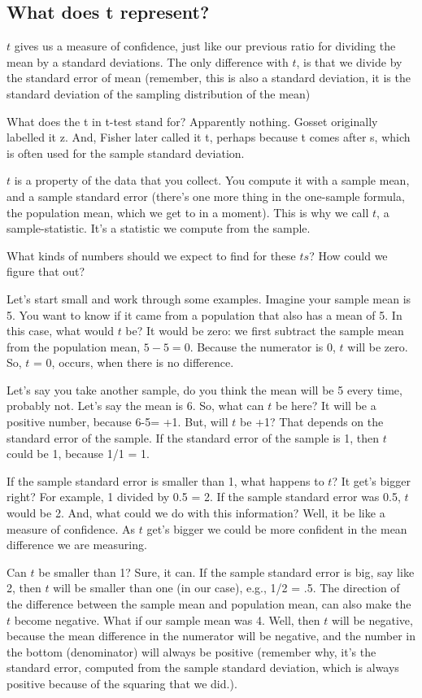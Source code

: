 \documentclass[
]{book}
\begin{document}
\subsection{What does t represent?}\label{what-does-t-represent}

\(t\) gives us a measure of confidence, just like our previous ratio for dividing the mean by a standard deviations. The only difference with \(t\), is that we divide by the standard error of mean (remember, this is also a standard deviation, it is the standard deviation of the sampling distribution of the mean)

What does the t in t-test stand for? Apparently nothing. Gosset originally labelled it z. And, Fisher later called it t, perhaps because t comes after s, which is often used for the sample standard deviation.

\(t\) is a property of the data that you collect. You compute it with a sample mean, and a sample standard error (there's one more thing in the one-sample formula, the population mean, which we get to in a moment). This is why we call \(t\), a sample-statistic. It's a statistic we compute from the sample.

What kinds of numbers should we expect to find for these \(ts\)? How could we figure that out?

Let's start small and work through some examples. Imagine your sample mean is 5. You want to know if it came from a population that also has a mean of 5. In this case, what would \(t\) be? It would be zero: we first subtract the sample mean from the population mean, \(5-5=0\). Because the numerator is 0, \(t\) will be zero. So, \(t\) = 0, occurs, when there is no difference.

Let's say you take another sample, do you think the mean will be 5 every time, probably not. Let's say the mean is 6. So, what can \(t\) be here? It will be a positive number, because 6-5= +1. But, will \(t\) be +1? That depends on the standard error of the sample. If the standard error of the sample is 1, then \(t\) could be 1, because 1/1 = 1.

If the sample standard error is smaller than 1, what happens to \(t\)? It get's bigger right? For example, 1 divided by 0.5 = 2. If the sample standard error was 0.5, \(t\) would be 2. And, what could we do with this information? Well, it be like a measure of confidence. As \(t\) get's bigger we could be more confident in the mean difference we are measuring.

Can \(t\) be smaller than 1? Sure, it can. If the sample standard error is big, say like 2, then \(t\) will be smaller than one (in our case), e.g., 1/2 = .5. The direction of the difference between the sample mean and population mean, can also make the \(t\) become negative. What if our sample mean was 4. Well, then \(t\) will be negative, because the mean difference in the numerator will be negative, and the number in the bottom (denominator) will always be positive (remember why, it's the standard error, computed from the sample standard deviation, which is always positive because of the squaring that we did.).
\end{document}
